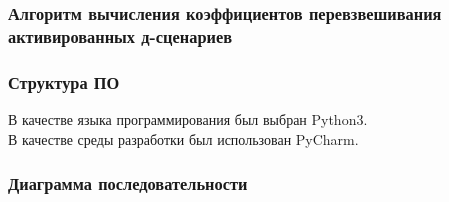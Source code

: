 \documentclass{beamer}
\begin{document}
\begin{frame}
    \frametitle{Алгоритм вычисления коэффициентов перевзвешивания активированных д-сценариев}
    \begin{figure}
        \centering
        
    \end{figure}
\end{frame}


\begin{frame}
    \frametitle{Структура ПО}
    \small
    В качестве языка программирования был выбран Python3.\\
    В качестве среды разработки был использован PyCharm.

    \vspace{0.2cm}
    \begin{figure}
        \centering
        
    \end{figure}
\end{frame}


\begin{frame}
    \frametitle{Диаграмма последовательности}
    \begin{figure}
        \centering
        
    \end{figure}
\end{frame}
\end{document}
